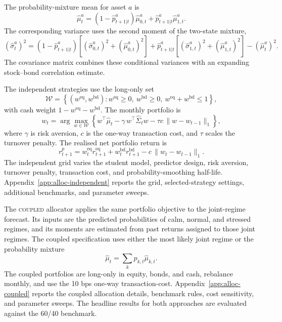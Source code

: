 \documentclass[10pt]{article}
\newcommand{\Acoup}{\textsc{coupled}}
\begin{document}
The probability-mixture mean for asset \(a\) is
\begin{equation}
    \hat\mu^a_t
    =
    (1-\hat p^a_{t+1|t})\hat\mu^a_{0,t}
    +
    \hat p^a_{t+1|t}\hat\mu^a_{1,t}.
    \label{eq:independent-allocation-mean}
\end{equation}
The corresponding variance uses the second moment of the two-state mixture,
\begin{equation}
    (\hat\sigma^a_t)^2
    =
    (1-\hat p^a_{t+1|t})
    \left[(\hat\sigma^a_{0,t})^2+(\hat\mu^a_{0,t})^2\right]
    +
    \hat p^a_{t+1|t}
    \left[(\hat\sigma^a_{1,t})^2+(\hat\mu^a_{1,t})^2\right]
    -
    (\hat\mu^a_t)^2 .
    \label{eq:independent-allocation-variance}
\end{equation}
The covariance matrix combines these conditional variances with an expanding stock--bond
correlation estimate.

The independent strategies use the long-only set
\[
    \mathcal W
    =
    \left\{
    (w^{\mathrm{eq}},w^{\mathrm{bd}}):
    w^{\mathrm{eq}}\ge0,\ 
    w^{\mathrm{bd}}\ge0,\ 
    w^{\mathrm{eq}}+w^{\mathrm{bd}}\le1
    \right\},
\]
with cash weight \(1-w^{\mathrm{eq}}-w^{\mathrm{bd}}\). The monthly portfolio is
\begin{equation}
    w_t
    =
    \arg\max_{w\in\mathcal W}
    \left\{
    w^{\top}\hat\mu_t
    -
    \gamma\,w^{\top}\hat\Sigma_t w
    -
    \tau c\,\lVert w-w_{t-1}\rVert_1
    \right\},
    \label{eq:mv}
\end{equation}
where \(\gamma\) is risk aversion, \(c\) is the one-way transaction cost, and \(\tau\) scales
the turnover penalty. The realised net portfolio return is
\[
    r^{p}_{t+1}
    =
    w^{\mathrm{eq}}_t r^{\mathrm{eq}}_{t+1}
    +
    w^{\mathrm{bd}}_t r^{\mathrm{bd}}_{t+1}
    -
    c\,\lVert w_t-w_{t-1}\rVert_1 .
\]
The independent grid varies the student model, predictor design, risk aversion, turnover
penalty, transaction cost, and probability-smoothing half-life. Appendix~\ref{app:alloc-independent}
reports the grid, selected-strategy settings, additional benchmarks, and parameter sweeps.

The \Acoup{} allocator applies the same portfolio objective to the joint-regime forecast. Its
inputs are the predicted probabilities of calm, normal, and stressed regimes, and its moments
are estimated from past returns assigned to those joint regimes. The coupled specification
uses either the most likely joint regime or the probability mixture
\[
    \hat\mu_t
    =
    \sum_k p_{k,t}\hat\mu_{k,t}.
\]
The coupled portfolios are long-only in equity, bonds, and cash, rebalance monthly, and use
the 10 bps one-way transaction-cost.
Appendix~\ref{app:alloc-coupled} reports the coupled allocation details, benchmark rules,
cost sensitivity, and parameter sweeps. The headline results for both approaches are
evaluated against the 60/40 benchmark.
\end{document}
